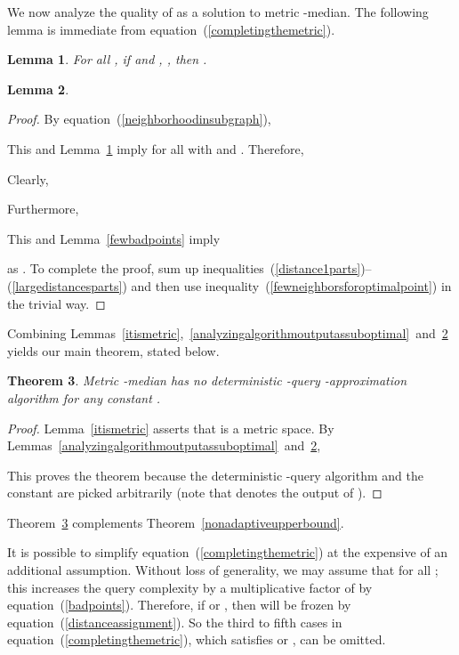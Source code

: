 \documentclass[letterpaper,12pt]{article}
\newtheorem{theorem}{Theorem}
\newtheorem{lemma}[theorem]{Lemma}
\begin{document}
We now analyze the quality of  as a solution to
{\sc metric -median}.
The following lemma is immediate from
equation~(\ref{completingthemetric}).

\begin{lemma}\label{optimalpointhasmanydistancesbeing1}
For all ,
if
 and
, ,
then .
\end{lemma}

\begin{lemma}\label{analyzingoptimalpoint}

\end{lemma}
\begin{proof}
By equation~(\ref{neighborhoodinsubgraph}),

This and
Lemma~\ref{optimalpointhasmanydistancesbeing1} imply
 for all  with
 and
.
Therefore,

Clearly,

Furthermore,

This and Lemma~\ref{fewbadpoints}
imply

as .
To complete the proof, sum
up
inequalities~(\ref{distance1parts})--(\ref{largedistancesparts})
and then use
inequality~(\ref{fewneighborsforoptimalpoint})
in the trivial way.
\end{proof}



Combining
Lemmas~\ref{itismetric},~\ref{analyzingalgorithmoutputassuboptimal}~and~\ref{analyzingoptimalpoint}
yields our main theorem, stated below.

\begin{theorem}\label{maintheorem}
{\sc Metric -median} has no deterministic -query
-approximation algorithm for any constant .
\end{theorem}
\begin{proof}
Lemma~\ref{itismetric} asserts that  is a metric space.
By
Lemmas~\ref{analyzingalgorithmoutputassuboptimal}~and~\ref{analyzingoptimalpoint},

This proves the theorem because
the deterministic -query algorithm 
and
the constant 
are picked arbitrarily (note that  denotes the output of ).
\end{proof}

Theorem~\ref{maintheorem}
complements
Theorem~\ref{nonadaptiveupperbound}.

It is possible to
simplify equation~(\ref{completingthemetric})
at the expensive of an additional assumption.
Without loss of generality, we may assume that 
for all ; this increases the query complexity by a multiplicative
factor of  by equation~(\ref{badpoints}).
Therefore, if  or , then
 will be frozen by equation~(\ref{distanceassignment}).
So the third to fifth
cases
in equation~(\ref{completingthemetric}),
which satisfies  or ,
can be omitted.
\end{document}
